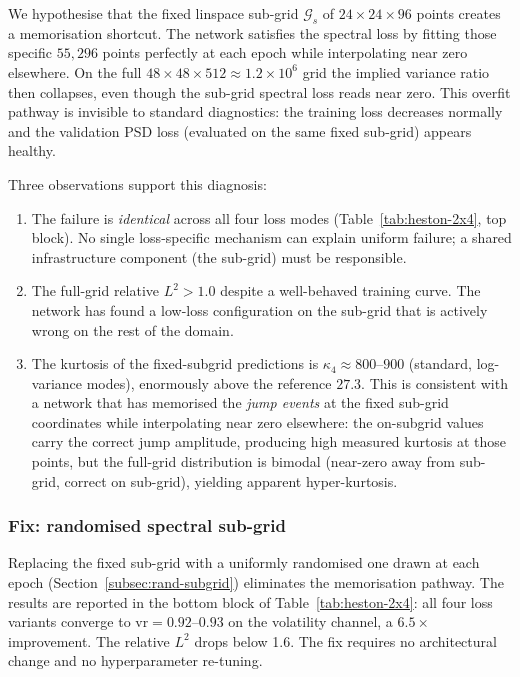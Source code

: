 \documentclass[review,12pt]{elsarticle}
\begin{document}
We hypothesise that the fixed linspace sub-grid \(\mathcal{G}_s\)
of \(24\times24\times96\) points creates a memorisation shortcut.
The network satisfies the spectral loss by fitting those specific
\(55{,}296\) points perfectly at each epoch while interpolating near
zero elsewhere. On the full \(48\times48\times512 \approx 1.2\times10^6\)
grid the implied variance ratio then collapses, even though the
sub-grid spectral loss reads near zero. This overfit pathway is
invisible to standard diagnostics: the training loss decreases
normally and the validation PSD loss (evaluated on the same fixed
sub-grid) appears healthy.

Three observations support this diagnosis:
\begin{enumerate}
\item The failure is \emph{identical} across all four loss modes
(Table~\ref{tab:heston-2x4}, top block). No single loss-specific
mechanism can explain uniform failure; a shared infrastructure
component (the sub-grid) must be responsible.
\item The full-grid relative \(L^2 > 1.0\) despite a well-behaved
training curve. The network has found a low-loss configuration on
the sub-grid that is actively wrong on the rest of the domain.
\item The kurtosis of the fixed-subgrid predictions is
\(\kappa_4 \approx 800\)--\(900\) (standard, log-variance modes),
enormously above the reference \(27.3\). This is consistent with
a network that has memorised the \emph{jump events} at the fixed
sub-grid coordinates while interpolating near zero elsewhere: the
on-subgrid values carry the correct jump amplitude, producing
high measured kurtosis at those points, but the full-grid
distribution is bimodal (near-zero away from sub-grid, correct on
sub-grid), yielding apparent hyper-kurtosis.
\end{enumerate}

\subsubsection{Fix: randomised spectral sub-grid}

Replacing the fixed sub-grid with a uniformly randomised one drawn
at each epoch (Section~\ref{subsec:rand-subgrid}) eliminates the
memorisation pathway. The results are reported in the bottom block
of Table~\ref{tab:heston-2x4}: all four loss variants converge to
\(\mathrm{vr} = 0.92\)--\(0.93\) on the volatility channel, a
\(6.5\times\) improvement. The relative \(L^2\) drops below 1.6.
The fix requires no architectural change and no hyperparameter
re-tuning.
\end{document}
